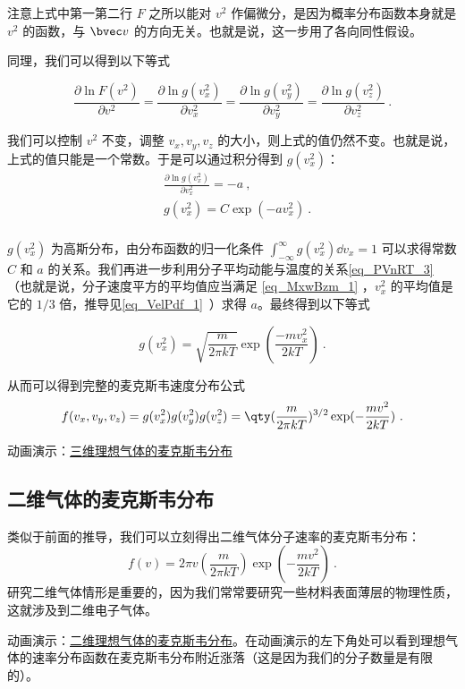 注意上式中第一第二行 $F$ 之所以能对 $v^2$ 作偏微分，是因为概率分布函数本身就是 $v^2$ 的函数，与 $\bvec v$ 的方向无关。也就是说，这一步用了各向同性假设。

同理，我们可以得到以下等式

\begin{equation}
\frac{\partial \ln F(v^2)}{\partial v^2}=\frac{\partial \ln g(v_x^2)}{\partial v_x^2}=\frac{\partial \ln g(v_y^2)}{\partial v_y^2}=\frac{\partial \ln g(v_z^2)}{\partial v_z^2}~.
\end{equation}

我们可以控制 $v^2$ 不变，调整 $v_x,v_y,v_z$ 的大小，则上式的值仍然不变。也就是说，上式的值只能是一个常数。于是可以通过积分得到 $g(v_x^2)$：
\begin{equation}
\begin{aligned}
&\frac{\partial \ln g(v_x^2)}{\partial v_x^2} = -a~,\\
&g(v_x^2)=C\exp(-av_x^2)~.\\
\end{aligned}
\end{equation}

$g(v_x^2)$ 为高斯分布，由分布函数的归一化条件 $\int_{-\infty}^\infty g(v_x^2)\dd v_x=1$ 可以求得常数 $C$ 和 $a$ 的关系。我们再进一步利用分子平均动能与温度的关系\autoref{eq_PVnRT_3}~ （也就是说，分子速度平方的平均值应当满足 \autoref{eq_MxwBzm_1} ，$v_x^2$ 的平均值是它的 $1/3$ 倍，推导见\autoref{eq_VelPdf_1}~）求得 $a$。最终得到以下等式

\begin{equation}
g(v_x^2)=\sqrt{\frac{m}{2\pi kT}}\exp(\frac{-mv_x^2}{2kT})~.
\end{equation}

从而可以得到完整的麦克斯韦速度分布公式
\begin{equation}
f(v_x,v_y,v_z)=g(v_x^2)g(v_y^2)g(v_z^2)=\qty(\frac{m}{2\pi k T})^{3/2}\exp(-\frac{mv^2}{2kT})~.
\end{equation}

动画演示：\href{https://wuli.wiki/apps/Maxwell3D/physics.html}{三维理想气体的麦克斯韦分布}

\subsection{二维气体的麦克斯韦分布}
类似于前面的推导，我们可以立刻得出二维气体分子速率的麦克斯韦分布：
\begin{equation}
f(v)=2\pi v\left(\frac{m}{2\pi kT}\right)\exp\left(-\frac{m v^2}{2kT}\right)~.
\end{equation}
研究二维气体情形是重要的，因为我们常常要研究一些材料表面薄层的物理性质，这就涉及到二维电子气体。

动画演示：\href{https://wuli.wiki/apps/Maxwell2D/physics.html}{二维理想气体的麦克斯韦分布}。在动画演示的左下角处可以看到理想气体的速率分布函数在麦克斯韦分布附近涨落（这是因为我们的分子数量是有限的）。